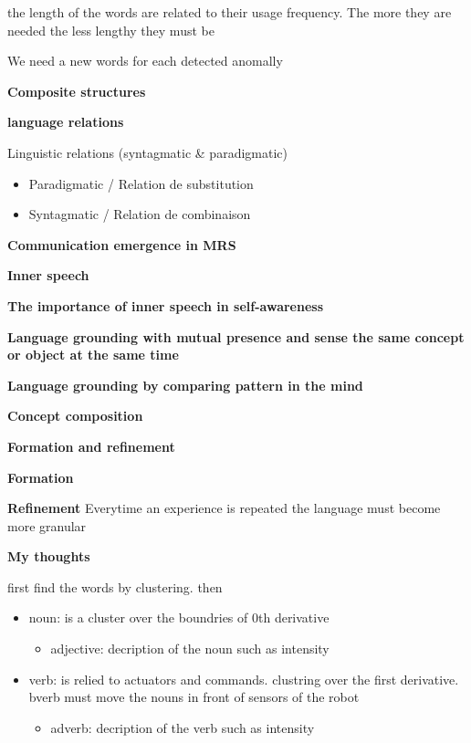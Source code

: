 \documentclass{book}
\providecommand{\ProjectDeepHeading}[2]{%
    \par\medskip\noindent\textbf{#2}\par\smallskip
}
\begin{document}
        the length of the words are related to their usage frequency. The more they are needed the less lengthy they must be
        
        We need a new words for each detected anomally
        
    \ProjectDeepHeading{3}{Composite structures}
    
    
    

\ProjectDeepHeading{2}{language relations}
    Linguistic relations (syntagmatic \& paradigmatic)
    \begin{itemize}
        \item Paradigmatic / Relation de substitution
        \item Syntagmatic / Relation de combinaison
    \end{itemize}

\ProjectDeepHeading{2}{Communication emergence in MRS}

\ProjectDeepHeading{2}{Inner speech}
    \textbf{The importance of inner speech in self-awareness} 

\ProjectDeepHeading{2}{Language grounding with mutual presence and sense the same concept or object at the same time}

\ProjectDeepHeading{2}{Language grounding by comparing pattern in the mind}

\ProjectDeepHeading{2}{Concept composition}

\ProjectDeepHeading{2}{Formation and refinement}
    \textbf{Formation}

    \textbf{Refinement} Everytime an experience is repeated the language must become more granular
    
\ProjectDeepHeading{2}{My thoughts}
first find the words by clustering. then
\begin{itemize}
    \item noun: is a cluster over the boundries of 0th derivative
        \begin{itemize}
            \item adjective: decription of the noun such as intensity
        \end{itemize}
    \item verb: is relied to actuators and commands. clustring over the first derivative. bverb must move the nouns in front of sensors of the robot
        \begin{itemize}
            \item adverb: decription of the verb such as intensity
        \end{itemize}
\end{itemize}
\end{document}
